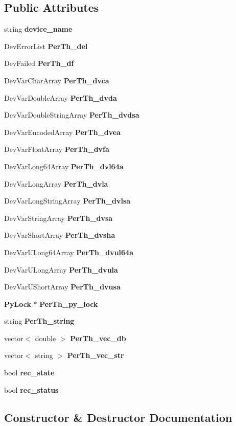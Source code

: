 \subsection*{Public Attributes}
\begin{DoxyCompactItemize}
\item 
string {\bf device\-\_\-name}
\item 
Dev\-Error\-List {\bf Per\-Th\-\_\-del}
\item 
Dev\-Failed {\bf Per\-Th\-\_\-df}
\item 
Dev\-Var\-Char\-Array {\bf Per\-Th\-\_\-dvca}
\item 
Dev\-Var\-Double\-Array {\bf Per\-Th\-\_\-dvda}
\item 
Dev\-Var\-Double\-String\-Array {\bf Per\-Th\-\_\-dvdsa}
\item 
Dev\-Var\-Encoded\-Array {\bf Per\-Th\-\_\-dvea}
\item 
Dev\-Var\-Float\-Array {\bf Per\-Th\-\_\-dvfa}
\item 
Dev\-Var\-Long64\-Array {\bf Per\-Th\-\_\-dvl64a}
\item 
Dev\-Var\-Long\-Array {\bf Per\-Th\-\_\-dvla}
\item 
Dev\-Var\-Long\-String\-Array {\bf Per\-Th\-\_\-dvlsa}
\item 
Dev\-Var\-String\-Array {\bf Per\-Th\-\_\-dvsa}
\item 
Dev\-Var\-Short\-Array {\bf Per\-Th\-\_\-dvsha}
\item 
Dev\-Var\-U\-Long64\-Array {\bf Per\-Th\-\_\-dvul64a}
\item 
Dev\-Var\-U\-Long\-Array {\bf Per\-Th\-\_\-dvula}
\item 
Dev\-Var\-U\-Short\-Array {\bf Per\-Th\-\_\-dvusa}
\item 
{\bf Py\-Lock} $\ast$ {\bf Per\-Th\-\_\-py\-\_\-lock}
\item 
string {\bf Per\-Th\-\_\-string}
\item 
vector$<$ double $>$ {\bf Per\-Th\-\_\-vec\-\_\-db}
\item 
vector$<$ string $>$ {\bf Per\-Th\-\_\-vec\-\_\-str}
\item 
bool {\bf rec\-\_\-state}
\item 
bool {\bf rec\-\_\-status}
\end{DoxyCompactItemize}


\subsection{Constructor \& Destructor Documentation}
